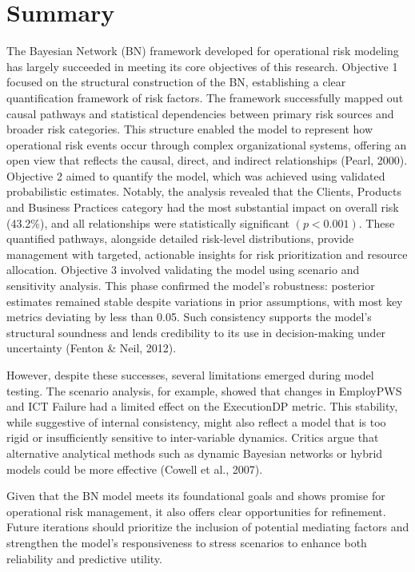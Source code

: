 \section{Summary}
The Bayesian Network (BN) framework developed for operational risk modeling has largely succeeded in meeting its core objectives of this research.  Objective 1 focused on the structural construction of the BN, establishing a clear quantification framework of risk factors. The framework successfully mapped out causal pathways and statistical dependencies between primary risk sources and broader risk categories. This structure enabled the model to represent how operational risk events occur through complex organizational systems, offering an open view that reflects the causal, direct, and indirect relationships (Pearl, 2000). Objective 2 aimed to quantify the model, which was achieved using validated probabilistic estimates. Notably, the analysis revealed that the Clients, Products and Business Practices category had the most substantial impact on overall risk (43.2\%), and all relationships were statistically significant $(p < 0.001)$. These quantified pathways, alongside detailed risk-level distributions, provide management with targeted, actionable insights for risk prioritization and resource allocation. Objective 3 involved validating the model using scenario and sensitivity analysis. This phase confirmed the model’s robustness: posterior estimates remained stable despite variations in prior assumptions, with most key metrics deviating by less than 0.05. Such consistency supports the model’s structural soundness and lends credibility to its use in decision-making under uncertainty (Fenton \& Neil, 2012).

However, despite these successes, several limitations emerged during model testing. The scenario analysis, for example, showed that changes in EmployPWS and ICT Failure had a limited effect on the ExecutionDP metric. This stability, while suggestive of internal consistency, might also reflect a model that is too rigid or insufficiently sensitive to inter-variable dynamics. Critics argue that alternative analytical methods such as dynamic Bayesian networks or hybrid models could be more effective (Cowell et al., 2007).

Given that the BN model meets its foundational goals and shows promise for operational risk management, it also offers clear opportunities for refinement. Future iterations should prioritize the inclusion of potential mediating factors and strengthen the model's responsiveness to stress scenarios to enhance both reliability and predictive utility.